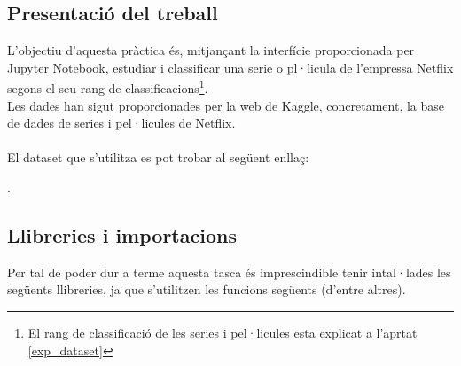 \documentclass[a4paper, 11pt]{article}
\begin{document}
\subsection{Presentació del treball}
L'objectiu d'aquesta pràctica és, mitjançant la interfície proporcionada per Jupyter Notebook, estudiar i classificar una serie o pl·licula de l'empressa Netflix segons el seu rang de classificacions\footnote{El rang de classificació de les series i pel·licules esta explicat a l'aprtat \textcolor{blue}{\ref{exp_dataset}}}. \\
Les dades han sigut proporcionades per la web de Kaggle, concretament, la base de dades de series i pel·licules de Netflix.\\\\
El dataset que s'utilitza es pot trobar al següent enllaç:
\begin{center}
    .
\end{center}
\newpage
\subsection{Llibreries i importacions}
Per tal de poder dur a terme aquesta tasca és imprescindible tenir intal·lades les següents llibreries, ja que s'utilitzen les funcions següents (d'entre altres).
\end{document}
